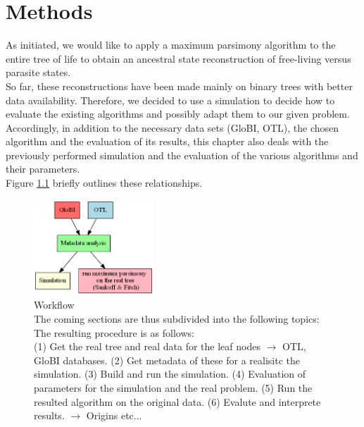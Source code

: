 \chapter{Methods}
  As initiated, we would like to apply a maximum parsimony algorithm to the entire tree of life to 
    obtain an ancestral state reconstruction of free-living versus parasite states. \\
  So far, these reconstructions have been made mainly on binary trees with better data availability. 
    Therefore, we decided to use a simulation to decide how to evaluate the existing algorithms and 
    possibly adapt them to our given problem. \\
  Accordingly, in addition to the necessary data sets (GloBI, OTL), the chosen algorithm and the 
    evaluation of its results, this chapter also deals with the previously performed simulation and 
    the evaluation of the various algorithms and their parameters. \\
  Figure \ref{fig:workflow} briefly outlines these relationships.
  \begin{figure}[h!]
    \centering
    \includegraphics[width=0.4\textwidth]{Figures/Workflow-overview.png}
    \caption{Workflow \\
      The coming sections are thus subdivided into the following topics: \\
       The resulting procedure is as follows: \\
      (1) Get the real tree and real data for the leaf nodes $\rightarrow$ OTL, GloBI databases.
      (2) Get metadata of these for a realisitc the simulation.
      (3) Build and run the simulation.
      (4) Evaluation of parameters for the simulation and the real problem.
      (5) Run the resulted algorithm on the original data.
      (6) Evalute and interprete results. $\rightarrow$ Origins etc...
    }
    \label{fig:workflow}
  \end{figure} \\
   \\

